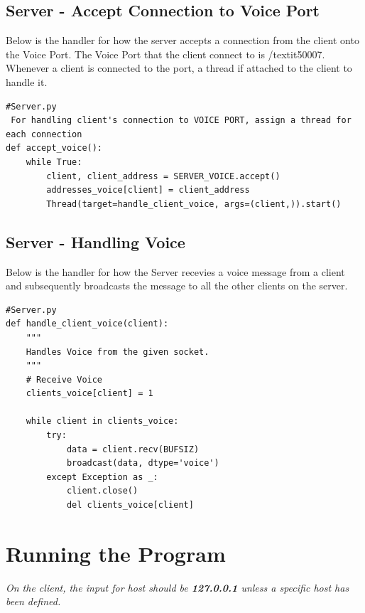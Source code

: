 \documentclass[a4paper,11pt]{article}
\begin{document}
\subsection{Server - Accept Connection to Voice Port}
Below is the handler for how the server accepts a connection from the client onto the Voice Port. The Voice Port that the client connect to is /textit{50007}. Whenever a client is connected to the port, a thread if attached to the client to handle it.

\begin{mdframed}[backgroundcolor=light-gray, roundcorner=30pt,leftmargin=1, rightmargin=1, innerleftmargin=5, innertopmargin=-3,innerbottommargin=5, outerlinewidth=1, linecolor=light-gray]
\begin{lstlisting}
#Server.py
 For handling client's connection to VOICE PORT, assign a thread for each connection
def accept_voice():
	while True:
		client, client_address = SERVER_VOICE.accept()
		addresses_voice[client] = client_address
		Thread(target=handle_client_voice, args=(client,)).start()
\end{lstlisting}
\end{mdframed}


\subsection{Server - Handling Voice}
Below is the handler for how the Server recevies a voice message from a client and subsequently broadcasts the message to all the other clients on the server.
\begin{mdframed}[backgroundcolor=light-gray, roundcorner=30pt,leftmargin=1, rightmargin=1, innerleftmargin=5, innertopmargin=-3,innerbottommargin=5, outerlinewidth=1, linecolor=light-gray]
\begin{lstlisting}
#Server.py
def handle_client_voice(client):
	"""
	Handles Voice from the given socket.
 	"""
	# Receive Voice
	clients_voice[client] = 1

	while client in clients_voice:
		try:
			data = client.recv(BUFSIZ)
			broadcast(data, dtype='voice')
		except Exception as _:
			client.close()
			del clients_voice[client]

\end{lstlisting}
\end{mdframed}

\section{Running the Program}
\textit{On the client, the input for host should be \textbf{127.0.0.1} unless a specific host has been defined.}
\end{document}
